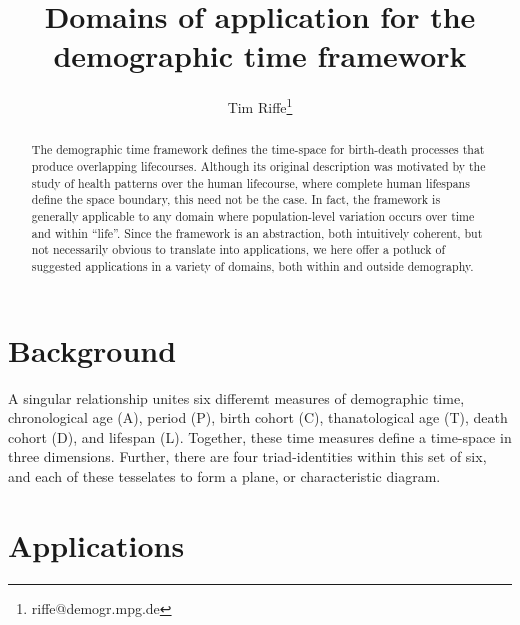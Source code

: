 \documentclass[11pt,oneside]{article} %
\begin{document}
\title{Domains of application for the demographic time framework}

\author[1]{Tim Riffe\thanks{riffe@demogr.mpg.de}}




\maketitle

\begin{abstract}
The demographic time framework defines the time-space for birth-death processes
that produce overlapping lifecourses. Although its original description was
motivated by the study of health patterns over the human lifecourse, where complete human lifespans define the space boundary, this need not be the case.
In fact, the framework is generally applicable to any domain where
population-level variation occurs over time and within ``life''. Since the
framework is an abstraction, both intuitively coherent, but not
necessarily obvious to translate into applications, we here offer a potluck of
suggested applications in a variety of domains, both within and outside demography.
\end{abstract}

\section*{Background}



A singular relationship unites six differemt measures of demographic time,
chronological age (A), period (P), birth cohort (C), thanatological age (T), death cohort (D), and
lifespan (L). Together, these time measures define a time-space in three
dimensions. Further, there are four triad-identities within this set of six, and
each of these tesselates to form a plane, or characteristic diagram.

\section{Applications}
\end{document}
